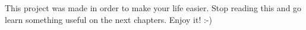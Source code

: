 This project was made in order to make your life easier. 
Stop reading this and go learn something useful on the next chapters. 
Enjoy it! :-)